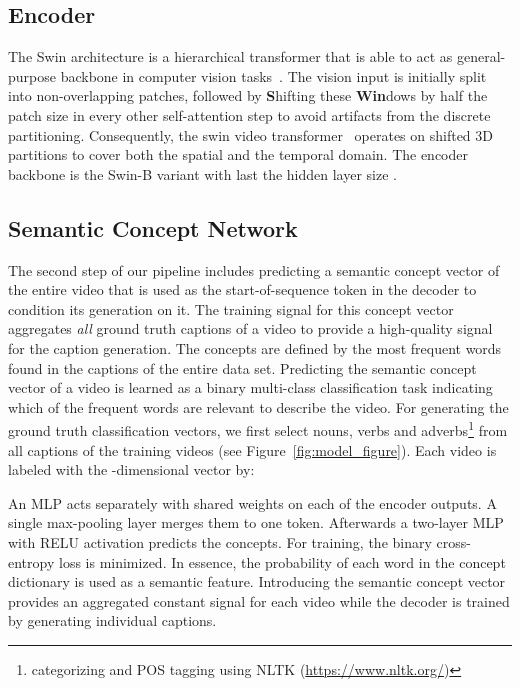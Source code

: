 \documentclass[runningheads,table]{llncs}
\begin{document}
\subsection{Encoder}
The Swin architecture is a hierarchical transformer that is able to act as general-purpose backbone in computer vision tasks~\cite{liu2021swin}. The vision input is initially split into non-overlapping patches, followed by \textbf{S}hifting these \textbf{Win}dows by half the patch size in every other self-attention step to avoid artifacts from the discrete partitioning. Consequently, the swin video transformer~\cite{liu2021video} operates on shifted 3D partitions to cover both the spatial and the temporal domain. The encoder backbone is the Swin-B variant with last the hidden layer size . 



\subsection{Semantic Concept Network}
The second step of our pipeline includes predicting a semantic concept vector of the entire video that is used as the start-of-sequence token in the decoder to condition its generation on it.
The training signal for this concept vector aggregates \emph{all} ground truth captions of a video to provide a high-quality signal for the caption generation. 
The concepts are defined by the  most frequent words found in the captions of the entire data set.
Predicting the semantic concept vector of a video is learned as a binary multi-class classification task indicating which of the frequent words are relevant to describe the video. 
For generating the ground truth classification vectors, we first select nouns, verbs and adverbs\footnote{categorizing and POS tagging using NLTK (\url{https://www.nltk.org/})} from all captions of the training videos (see Figure~\ref{fig:model_figure}). 
Each video is labeled with the -dimensional vector  by:



An MLP acts separately with shared weights on each of the encoder outputs. A single max-pooling layer merges them to one token. Afterwards a two-layer MLP with RELU activation predicts the  concepts. For training, the binary cross-entropy loss is minimized. In essence, the probability of each word in the concept dictionary is used as a semantic feature.
Introducing the semantic concept vector provides an aggregated constant signal for each video while the decoder is trained by generating individual captions. 
\end{document}

